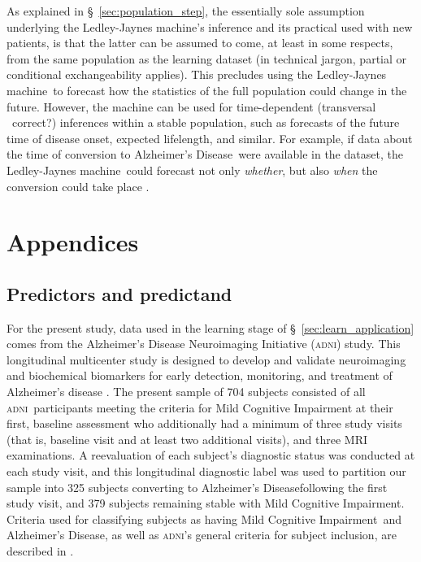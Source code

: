 \documentclass[utf8]{FrontiersinHarvard} %
\newcommand*{\puzzle}{{\fontencoding{U}\fontfamily{fontawesometwo}\selectfont\symbol{225}}}
\newcommand{\mynotez}[1]{{\color{notecolour}\puzzle\ #1}}
\newcommand*{\sect}{\S}%
\newcommand*{\eg}{{e.g.}}
\newcommand*{\cf}{{cf.}}
\renewcommand*{\|}[1][]{\nonscript\:#1\vert\nonscript\:\mathopen{}}
\newcommand*{\ad}{Alzheimer's Disease}
\newcommand*{\mci}{Mild Cognitive Impairment}
\newcommand*{\ljm}{Ledley-Jaynes machine}
\newcommand*{\adni}{\textsc{adni}}
\begin{document}
As explained in \sect~\ref{sec:population_step}, the essentially sole assumption underlying the \ljm's inference and its practical used with new patients, is that the latter can be assumed to come, at least in some respects, from the same population as the learning dataset (in technical jargon, partial or conditional exchangeability applies). This precludes using the \ljm\ to forecast how the statistics of the full population could change in the future. However, the machine can be used for time-dependent (transversal \mynotez{correct?}) inferences within a stable population, such as forecasts of the future time of disease onset, expected lifelength, and similar. For example, if data about the time of conversion to \ad\ were available in the dataset, the \ljm\ could forecast not only \emph{whether}, but also \emph{when} the conversion could take place \citep[\cf\ \eg][]{delacruzmesiaetal2007}.


\newpage%
\appendix
\renewcommand\thesection{\Alph{section}}
\section{Appendices}
\label{sec:appendices}


\subsection{Predictors and predictand}
\label{sec:predictors_description}

For the present study, data used in the learning stage of \sect~\ref{sec:learn_application} comes from the Alzheimer's Disease Neuroimaging Initiative (\adni) study. This longitudinal multicenter study is designed to develop and validate neuroimaging and biochemical biomarkers for early detection, monitoring, and treatment of Alzheimer's disease \citep{petersenetal2010}. The present sample of 704 subjects consisted of all \adni\ participants meeting the criteria for Mild Cognitive Impairment at their first, baseline assessment who additionally had a minimum of three study visits (that is, baseline visit and at least two additional visits), and three MRI examinations. A reevaluation of each subject's diagnostic status was conducted at each study visit, and this longitudinal diagnostic label was used to partition our sample into 325 subjects converting to \ad following the first study visit, and 379 subjects remaining stable with \mci. Criteria used for classifying subjects as having \mci\ and \ad, as well as \adni's general criteria for subject inclusion, are described in \citet{mckhannetal1984,petersenetal2010}.
\end{document}
